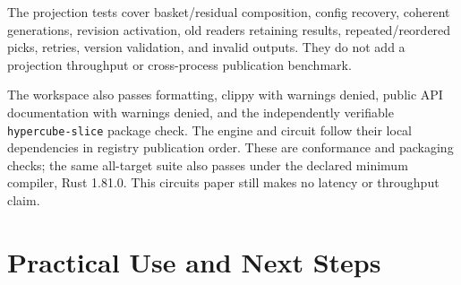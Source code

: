 \documentclass{strategynet-journal}
\begin{document}
The projection tests cover basket/residual composition, config recovery,
coherent generations, revision activation, old readers retaining results,
repeated/reordered picks, retries, version validation, and invalid outputs.
They do not add a projection throughput or cross-process publication benchmark.

The workspace also passes formatting, clippy with warnings denied, public API
documentation with warnings denied, and the independently verifiable
\texttt{hypercube-slice} package check.  The engine and circuit follow their
local dependencies in registry publication order.  These are conformance and
packaging checks; the same all-target suite also passes under the declared
minimum compiler, Rust 1.81.0.  This circuits paper still makes no latency or
throughput claim.

\section{Practical Use and Next Steps}
\end{document}
